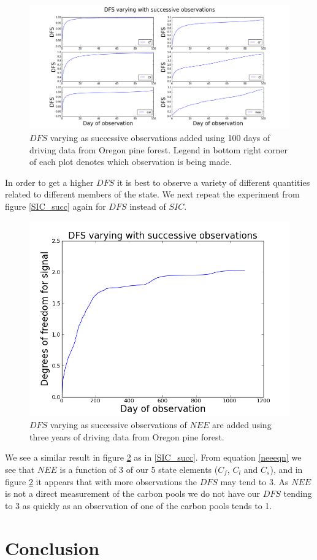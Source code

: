 \documentclass[11pt]{article}
\begin{document}
\begin{figure}[ht]
\centering
\includegraphics[height=.42\textwidth]{dfssubplt.png}
\caption{$DFS$ varying as successive observations added using 100 days of driving data from Oregon pine forest. Legend in bottom right corner of each plot denotes which observation is being made.}
\label{dfsobs}
\end{figure}

In order to get a higher $DFS$ it is best to observe a variety of different quantities related to different members of the state. We next repeat the experiment from figure \ref{SIC_succ} again for $DFS$ instead of $SIC$.

\begin{figure}[ht]
\centering
\includegraphics[height=.34\textwidth]{DFS0_1090nee.png}
\caption{$DFS$ varying as successive observations of $NEE$ are added using three years of driving data from Oregon pine forest.}
\label{dfsnee}
\end{figure}

We see a similar result in figure \ref{dfsnee} as in \ref{SIC_succ}. From equation \ref{neeeqn} we see that $NEE$ is a function of 3 of our 5 state elements ($C_f$, $C_l$ and $C_s$), and in figure \ref{dfsnee} it appears that with more observations the $DFS$ may tend to 3. As $NEE$ is not a direct measurement of the carbon pools we do not have our $DFS$ tending to 3 as quickly as an observation of one of the carbon pools tends to 1. 


\section{Conclusion}%
\end{document}
